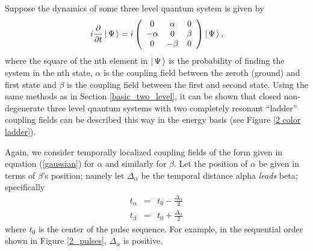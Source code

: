 Suppose the dynamics of some three level quantum system is given by
\begin{equation}
i\frac{\partial}{\partial t} \left| \hspace{0.15em} \Psi \hspace{0.15em}\right\rangle
=
i\left(
\begin{array}{cccc}
0 & \alpha & 0 \\
-\alpha & 0 & \beta \\
0 & -\beta & 0
\end{array}
\right)
\left| \hspace{0.15em} \Psi \hspace{0.15em}\right\rangle,
\label{two dynamics}
\end{equation}
where the square of the nth element in $\left| \hspace{0.15em} \Psi \hspace{0.15em}\right\rangle$ is the probability of finding the system in the nth state, $\alpha$ is the coupling field between the zeroth (ground) and first state and $\beta$ is the coupling field between the first and second state. Using the same methods as in Section \ref{basic_two_level}, it can be shown that closed non-degenerate three level quantum systems with two completely resonant ``ladder'' coupling fields can be described this way in the energy basis (see Figure \ref{2 color ladder}).

Again, we consider temporally localized coupling fields of the form given in equation (\ref{gaussian}) for $\alpha$ and similarly for $\beta$. Let the position of $\alpha$ be given in terms of $\beta$'s position; namely let $\Delta_\alpha$ be the temporal distance alpha \emph{leads} beta; specifically
\begin{subequations}
\begin{eqnarray} 
t_\alpha & = & t_0 - \frac{\Delta_\alpha}{2} \\
t_\beta  & = & t_0 + \frac{\Delta_\alpha}{2}
\end{eqnarray}
\label{temporal position}
\end{subequations}
where $t_0$ is the center of the pulse sequence. For example, in the sequential order shown in Figure \ref{2_pulses}, $\Delta_\alpha$ is positive.

